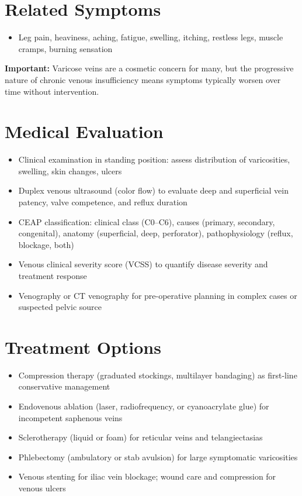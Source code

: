 \section*{Related Symptoms}
\begin{itemize}
  \item Leg pain, heaviness, aching, fatigue, swelling, itching, restless legs, muscle cramps, burning sensation
\end{itemize}
\textbf{Important:} Varicose veins are a cosmetic concern for many, but the progressive nature of chronic venous insufficiency means symptoms typically worsen over time without intervention.

\section*{Medical Evaluation}
\begin{itemize}
  \item Clinical examination in standing position: assess distribution of varicosities, swelling, skin changes, ulcers
  \item Duplex venous ultrasound (color flow) to evaluate deep and superficial vein patency, valve competence, and reflux duration
  \item CEAP classification: clinical class (C0--C6), causes (primary, secondary, congenital), anatomy (superficial, deep, perforator), pathophysiology (reflux, blockage, both)
  \item Venous clinical severity score (VCSS) to quantify disease severity and treatment response
  \item Venography or CT venography for pre-operative planning in complex cases or suspected pelvic source
\end{itemize}

\section*{Treatment Options}
\begin{itemize}
  \item Compression therapy (graduated stockings, multilayer bandaging) as first-line conservative management
  \item Endovenous ablation (laser, radiofrequency, or cyanoacrylate glue) for incompetent saphenous veins
  \item Sclerotherapy (liquid or foam) for reticular veins and telangiectasias
  \item Phlebectomy (ambulatory or stab avulsion) for large symptomatic varicosities
  \item Venous stenting for iliac vein blockage; wound care and compression for venous ulcers
\end{itemize}

